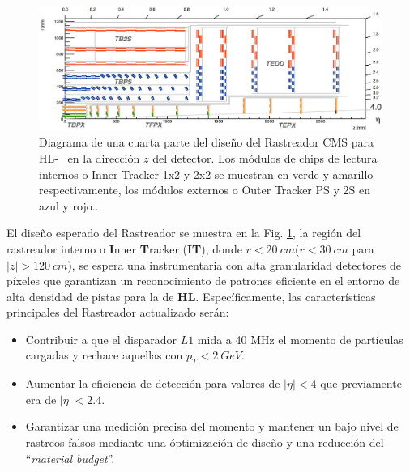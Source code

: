 \begin{figure}[!h]
\centering
\includegraphics[width=.95\textwidth]{Analisis_y_Resultados/imagenes/track.png}
\caption[Diagrama de una cuarta parte del diseño del Rastreador \CMS ~ para \LHC ~ en la dirección $z$ del detector. Los módulos de chips de lectura internos o Inner Tracker 1x2 y 2x2 se muestran en verde y amarillo respectivamente, los módulos externos o Outer Tracker PS y 2S en azul y rojo.]{Diagrama de una cuarta parte del diseño del Rastreador CMS para HL-\LHC ~ en la dirección $z$ del detector. Los módulos de chips de lectura internos o Inner Tracker 1x2 y 2x2 se muestran en verde y amarillo respectivamente, los módulos externos o Outer Tracker PS y 2S en azul y rojo.\footnotemark.}
\label{track}
\end{figure}



El diseño esperado del Rastreador se muestra en la Fig. \ref{track}, la región del rastreador interno o \textbf{I}nner \textbf{T}racker (\textbf{IT}), donde $r < 20 ~ cm$($r < 30 ~ cm$ para $|z|> 120 ~ cm$), se espera una instrumentaria con alta granularidad detectores de píxeles que garantizan un reconocimiento de patrones eficiente en el entorno de alta densidad de pistas para la de \textbf{HL}. %
Específicamente, las características principales del Rastreador actualizado serán:
\begin{itemize}
\item Contribuir a que el disparador $L1$ mida a 40 MHz el momento de partículas cargadas y rechace aquellas con $p_T < 2 ~ GeV$.
\item Aumentar la eficiencia de detección para valores de $|\eta| < 4$ que previamente era de $|\eta| < 2.4$. 
\item Garantizar una medición precisa del momento y mantener un bajo nivel de rastreos falsos mediante una óptimización de diseño y una reducción del ``\textit{material budget}''.
\end{itemize}



